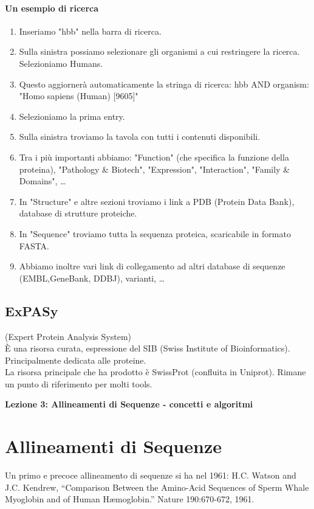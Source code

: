 \documentclass{article}
\begin{document}
\paragraph{Un esempio di ricerca}
\begin{enumerate}
    \item Inseriamo "{\ttfamily hbb}" nella barra di ricerca.
    \item Sulla sinistra possiamo selezionare gli organismi a cui restringere la ricerca. Selezioniamo Humans.
    \item Questo aggiornerà automaticamente la stringa di ricerca: {\ttfamily hbb AND organism: "Homo sapiens (Human) [9605]"}
    \item Selezioniamo la prima entry.
    \item Sulla sinistra troviamo la tavola con tutti i contenuti disponibili.
    \item Tra i più importanti abbiamo: "Function" (che specifica la funzione della proteina), "Pathology \& Biotech", "Expression", "Interaction", "Family \& Domains", \dots
    \item In "Structure" e altre sezioni troviamo i link a PDB (Protein Data Bank), database di strutture proteiche.
    \item In "Sequence" troviamo tutta la sequenza proteica, scaricabile in formato FASTA.
    \item Abbiamo inoltre vari link di collegamento ad altri database di sequenze (EMBL,GeneBank, DDBJ), varianti, \dots
\end{enumerate}
\subsection{ExPASy}
(Expert Protein Analysis System)\\
È una risorsa curata, espressione del SIB (Swiss Institute of
Bioinformatics). Principalmente dedicata alle proteine.\\
La risorsa principale che ha prodotto è SwissProt (confluita in Uniprot). Rimane un punto di riferimento per molti tools. 

\begin{titlepage}
    \begin{center}
        \vspace*{1cm}
        \LARGE
        \textbf{Lezione 3: Allineamenti di Sequenze - concetti e algoritmi}

    \end{center}
\end{titlepage}
\section{Allineamenti di Sequenze}
Un primo e precoce allineamento di sequenze si ha nel 1961: H.C. Watson and J.C. Kendrew,
“Comparison Between the Amino-Acid Sequences of Sperm Whale Myoglobin and of Human Hæmoglobin.” Nature 190:670-672, 1961.\\
\end{document}
